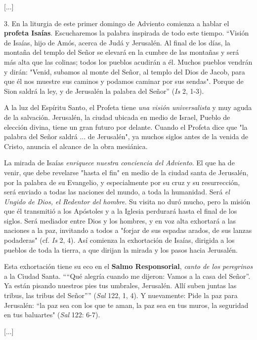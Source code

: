 \begin{body}
\begin{body}
{[}...{]}

3. En la liturgia de este primer domingo de Adviento comienza a hablar el \textbf{profeta Isaías}. Escucharemos la palabra inspirada de todo este tiempo. ``Visión de Isaías, hijo de Amós, acerca de Judá y Jerusalén. Al final de los días, la montaña del templo del Señor se elevará en la cumbre de las montañas y será más alta que las colinas; todos los pueblos acudirán a él. Muchos pueblos vendrán y dirán: "Venid, subamos al monte del Señor, al templo del Dios de Jacob, para que él nos muestre sus caminos y podamos caminar por sus sendas". Porque de Sion saldrá la ley, y de Jerusalén la palabra del Señor'' (\emph{Is} 2, 1-3).

A la luz del Espíritu Santo, el Profeta tiene \emph{una visión universalista} y muy aguda de la salvación. Jerusalén, la ciudad ubicada en medio de Israel, Pueblo de elección divina, tiene un gran futuro por delante. Cuando el Profeta dice que "la palabra del Señor saldrá ... de Jerusalén", ya muchos siglos antes de la venida de Cristo, anuncia el alcance de la obra mesiánica.

La mirada de Isaías \emph{enriquece nuestra conciencia del Adviento}. El que ha de venir, que debe revelarse "hasta el fin" en medio de la ciudad santa de Jerusalén, por la palabra de su Evangelio, y especialmente por su cruz y su resurrección, será enviado a todas las naciones del mundo, a toda la humanidad. Será \emph{el Ungido de Dios, el Redentor del hombre}. Su visita no duró mucho, pero la misión que él transmitió a los Apóstoles y a la Iglesia perdurará hasta el final de los siglos. Será mediador entre Dios y los hombres, y en voz alta exhortará a las naciones a la paz, invitando a todos a "forjar de sus espadas arados, de sus lanzas podaderas" (cf. \emph{Is} 2, 4). Así comienza la exhortación de Isaías, dirigida a los pueblos de toda la tierra, a que dirijan la mirada y los pasos hacia Jerusalén.

Esta exhortación tiene su eco en el \textbf{Salmo Responsorial}, \emph{canto de los peregrinos} a la Ciudad Santa. ````Qué alegría cuando me dijeron: Vamos a la casa del Señor''. Ya están pisando nuestros pies tus umbrales, Jerusalén. Allí suben juntas las tribus, las tribus del Señor'''' (\emph{Sal} 122, 1, 4). Y nuevamente: Pide la paz para Jerusalén: ``la paz sea con los que te aman, la paz sea en tus muros, la seguridad en tus baluartes" (\emph{Sal} 122: 6-7).

{[}...{]}


\end{body}
\end{body}
